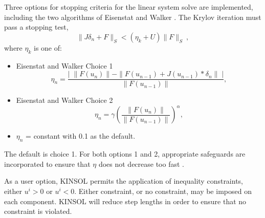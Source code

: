Three options for stopping criteria for the linear system solve are
implemented, including the two 
algorithms of Eisenstat and Walker \cite{EiWa:96}.
The Krylov iteration must pass a stopping test,
\[ \|J \delta_n + F\|_S < (\eta_k + U) \|F\|_S ~, \]
where $\eta_k$ is one of:
\begin{itemize}
\item Eisenstat and Walker Choice 1
\[ \eta_n = \frac{\left|\; \|F(u_n)\|  
                           - \|F(u_{n-1}) + J(u_{n-1}) * \delta_n \| 
                  \; \right|}
               {\|F(u_{n-1})\|},  \]
\item Eisenstat and Walker Choice 2
\[ \eta_n = \gamma \left( \frac{ \|F(u_n)\|}{\|F(u_{n-1})\|} \right)^{\alpha},
\] 
\item  $\eta_n$ = constant with 0.1 as the default.
\end{itemize}
The default is choice 1.  For both options 1 and 2, appropriate 
safeguards are incorporated to ensure that $\eta$ does not decrease 
too fast \cite{EiWa:96}.

As a user option, KINSOL permits the application of inequality
constraints, either $u^i > 0$ or $u^i < 0$.  Either constraint, or
no constraint, may be imposed on each component.  KINSOL will reduce 
step lengths in order to ensure that no constraint is violated.


